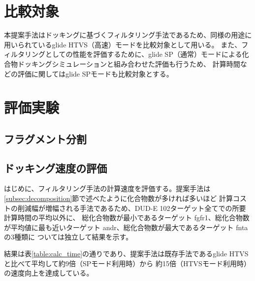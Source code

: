 \section{比較対象}
本提案手法はドッキングに基づくフィルタリング手法であるため、同様の用途に用いられているglide HTVS（高速）モードを比較対象として用いる。
また、フィルタリングとしての性能を評価するために、glide SP（通常）モードによる化合物ドッキングシミュレーションと組み合わせた評価も行うため、
計算時間などの評価に関してはglide SPモードも比較対象とする。

\section{評価実験}

\subsection{フラグメント分割}

\subsection{ドッキング速度の評価}\label{subsec:single_calc_time}
はじめに、フィルタリング手法の計算速度を評価する。提案手法は\ref{subsec:decomposition}節で述べたように化合物数が多ければ多いほど
計算コストの削減幅が増幅される手法であるため、DUD-E 102ターゲット全てでの所要計算時間の平均以外に、
総化合物数が最小であるターゲット fgfr1、総化合物数が平均値に最も近いターゲット andr、総化合物数が最大であるターゲット fntaの3種類に
ついては独立して結果を示す。

結果は表\ref{table:calc_time}の通りであり、提案手法は既存手法であるglide HTVSと比べて平均して約9倍（SPモード利用時）から
約15倍（HTVSモード利用時）の速度向上を達成している。

